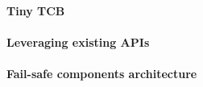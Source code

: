 \documentclass{acm_proc_article-sp} %
\begin{document}
\paragraph{Tiny TCB}
\paragraph{Leveraging existing APIs}
\paragraph{Fail-safe components architecture}
\subsection{}


%
%
%
%
%
%
%
\end{document}

